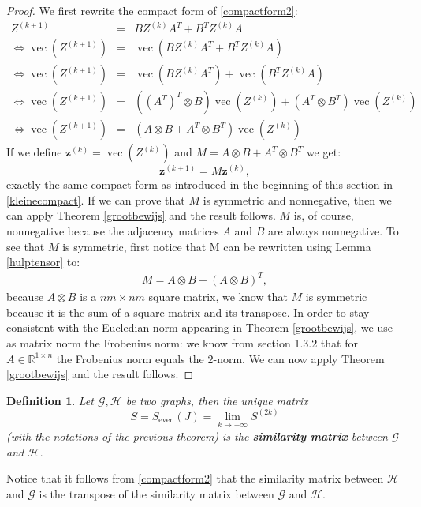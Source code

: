 \documentclass[a4paper,11pt]{report}
\newtheorem{definition}[theorem]{Definition}
\newcommand{\R}{{\mathbb R}}
\newcommand{\graf}{\mathscr{G}}
\newcommand{\grafeen}{\mathscr{H}}
\newcommand{\vect}{\operatorname{vec}}
\begin{document}
\begin{proof}
  We first rewrite the compact form of \ref{compactform2}:
  \begin{eqnarray*}
    Z^{(k+1)} &=& BZ^{(k)}A^T + B^TZ^{(k)}A\\
 \Leftrightarrow   \vect(Z^{(k+1)}) &=& \vect(BZ^{(k)}A^T + B^TZ^{(k)}A)\\
 \Leftrightarrow   \vect(Z^{(k+1)}) &=& \vect(BZ^{(k)}A^T) + \vect(B^TZ^{(k)}A)\\
 \Leftrightarrow   \vect(Z^{(k+1)}) &=& \left( (A^T)^T \otimes B\right)\vect(Z^{(k)}) + \left( A^T \otimes B^T\right)\vect(Z^{(k)})\\
  \Leftrightarrow  \vect(Z^{(k+1)}) &=& (A \otimes B + A^T \otimes B^T)\vect(Z^{(k)})
  \end{eqnarray*}
If we define $\mathbf{z}^{(k)} = \vect(Z^{(k)})$ and $M = A \otimes B + A^T \otimes 
B^T$ we get:
$$\mathbf{z}^{(k+1)} = M\mathbf{z}^{(k)},$$
exactly the same compact form as introduced in the beginning of this section in 
\ref{kleinecompact}. If we can prove that $M$ is symmetric and nonnegative, then
we can apply Theorem \ref{grootbewijs} and the result follows. $M$ is, of 
course, nonnegative because the adjacency matrices $A$ and $B$ are always 
nonnegative. To see that $M$ is symmetric, first notice that M can be rewritten 
using Lemma \ref{hulptensor} to:
\begin{eqnarray}\label{uitgeschrevenvectornormaal}
M = A \otimes B + (A \otimes  B)^T,
\end{eqnarray}
because $A \otimes B$ is a $nm \times nm$ square matrix, we know that $M$ is 
symmetric because it is the sum of a square matrix and its transpose. In order 
to stay consistent with the Eucledian norm appearing in Theorem \ref{grootbewijs}, we use as matrix norm
the Frobenius norm: we know from section 1.3.2 that for $A \in \R^{1\times n}$ the Frobenius norm equals the
$2$-norm. 
We can now apply Theorem \ref{grootbewijs} and the result follows.
\end{proof}
\begin{definition}
  Let $\graf, \grafeen$ be two graphs, then the unique matrix
   $$S = S_\text{even}(J) = \lim_{k\to +\infty} S^{(2k)}$$ 
 (with the notations of the previous theorem) is the \textbf{similarity matrix} between $\graf$ and
   $\grafeen$.
\end{definition}
Notice that it follows from \ref{compactform2} that the similarity matrix 
between $\grafeen$ and $\graf$ is the transpose of the similarity matrix between 
$\graf$ and $\grafeen$.
\end{document}
